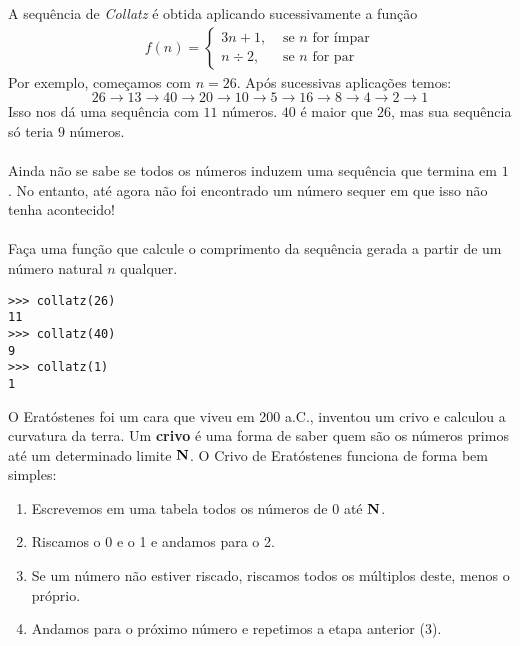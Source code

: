 \documentclass[12pt]{article}
\begin{document}
	A sequência de \emph{Collatz} é obtida aplicando sucessivamente a função
	{\large
		\begin{align*}
		f(n) = \begin{cases}
		3n + 1, &\text{ se } n \text{ for ímpar}\\
		n \div 2, &\text{ se } n \text{ for par}
		\end{cases}
		\end{align*}
	}
	Por exemplo, começamos com $n = 26$. Após sucessivas aplicações temos:
	$$26 \to 13 \to 40 \to 20 \to 10 \to 5 \to 16 \to 8 \to 4 \to 2 \to 1$$
	Isso nos dá uma sequência com $11$ números. $40$ é maior que $26$, mas sua sequência só teria $9$ números.\\
	\\
	Ainda não se sabe se todos os números induzem uma sequência que termina em $1$. No entanto, até agora não foi encontrado um número sequer em que isso não tenha acontecido!\\
	\\
	\quest Faça uma função que calcule o comprimento da sequência gerada a partir de um número natural $n$ qualquer.\\
	
	\example
	\begin{lstlisting}
>>> collatz(26)
11
>>> collatz(40)
9
>>> collatz(1)
1
	\end{lstlisting}
	
	\pagebreak
	
	
	O Eratóstenes foi um cara que viveu em 200 a.C., inventou um crivo e calculou a curvatura da terra.
	\vspace{-10pt}
	\vspace{-30pt}
	Um \textbf{crivo} é uma forma de saber quem são os números primos até um determinado limite $\mathbf{N}$. O Crivo de Eratóstenes funciona de forma bem simples:
	
	\begin{enumerate}
		\item Escrevemos em uma tabela todos os números de 0 até $\mathbf{N}$.

		\item Riscamos o 0 e o 1 e andamos para o 2.

		\item Se um número não estiver riscado, riscamos todos os múltiplos deste, menos o próprio.
		
		\item Andamos para o próximo número e repetimos a etapa anterior (3).		
	\end{enumerate}
	
\end{document}

